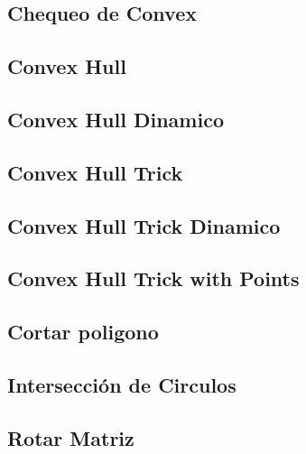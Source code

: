\subsection{Chequeo de Convex}


\subsection{Convex Hull}


\subsection{Convex Hull Dinamico}


\subsection{Convex Hull Trick}


\subsection{Convex Hull Trick Dinamico}


\subsection{Convex Hull Trick with Points}


\subsection{Cortar poligono}


\subsection{Intersecci\'on de Circulos}


\subsection{Rotar Matriz}

